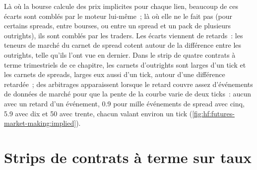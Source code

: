 Là où la bourse calcule des prix implicites pour chaque lien, beaucoup de ces écarts sont comblés par le moteur lui-même~; là où elle ne le fait pas (pour certains spreads,
entre bourses, ou entre un spread et un pack de plusieurs outrights), ils sont comblés par les traders. Les écarts viennent de retards~: les teneurs de marché du carnet de spread
cotent autour de la différence entre les outrights, telle qu'ils l'ont vue en dernier. Dans le strip de quatre contrats à terme trimestriels de ce chapitre, les carnets d'outrights sont larges d'un tick et
les carnets de spreads, larges eux aussi d'un tick, autour d'une différence retardée~; des arbitrages apparaissent lorsque le retard couvre assez d'événements de données de marché pour que la pente de la courbe varie de
deux ticks~: aucun avec un retard d'un événement, 0.9 pour mille événements de spread avec cinq, 5.9 avec dix et 50 avec trente, chacun valant environ un tick
(\cref{fig:hf:futures-market-making:implied}).

\begin{omfigure}

\label{fig:hf:futures-market-making:implied}
\end{omfigure}

\section{Strips de contrats à terme sur taux}

